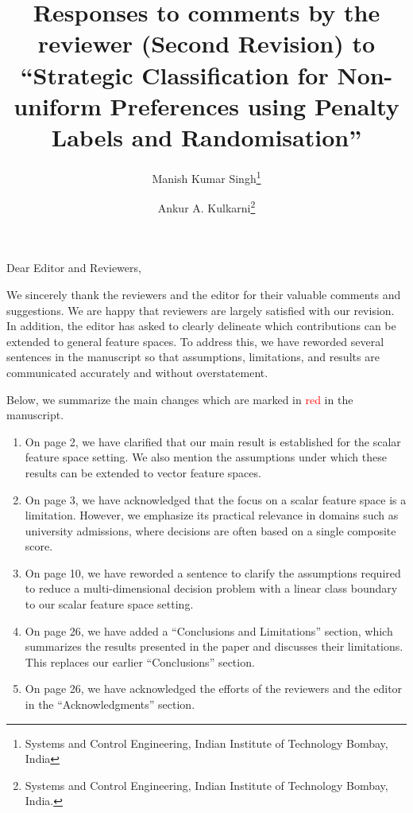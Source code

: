 \documentclass[11pt]{article}
\begin{document}
\title{Responses to comments by the reviewer (Second Revision) to ``Strategic Classification for Non-uniform Preferences using Penalty Labels and Randomisation''}
\author{Manish Kumar Singh\thanks{Systems and Control Engineering, Indian Institute of Technology Bombay, India} \and Ankur A. Kulkarni\thanks{Systems and Control Engineering, Indian Institute of Technology Bombay, India.}}
\date{}
\maketitle

\noindent Dear Editor and Reviewers,
\vspace{.5cm}

\indent We sincerely thank the reviewers and the editor for their valuable comments and suggestions. We are happy that reviewers are largely satisfied with our revision. In addition, the editor has asked to clearly delineate which contributions can be extended to general 
feature spaces. To address this, we have reworded several sentences in the manuscript so that assumptions, limitations, and results are communicated accurately and without overstatement.

Below, we summarize the main changes which are marked in \textcolor{red}{red} in the manuscript.
\begin{enumerate}
    \item On page 2, we have clarified that our main result is established for the scalar feature space setting. We also mention the assumptions under which these results can be extended to vector feature spaces.
    \item On page 3, we have acknowledged that the focus on a scalar feature space is a limitation. However, we emphasize its practical relevance in domains such as university admissions, where decisions are often based on a single composite score.
    \item On page 10, we have reworded a sentence to clarify the assumptions required to reduce a multi-dimensional decision problem with a linear class boundary to our scalar feature space setting.    
    \item On page 26, we have added a “Conclusions and Limitations” section, which summarizes the results presented in the paper and discusses their limitations. This replaces our earlier “Conclusions” section.
    \item On page 26, we have acknowledged the efforts of the reviewers and the editor in the “Acknowledgments” section.
\end{enumerate}
\end{document}
